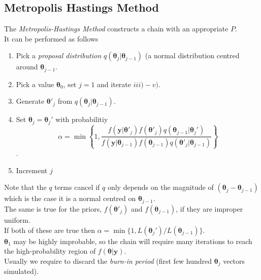 \documentclass[11pt,a4paper]{article}
\begin{document}
\subsection{Metropolis Hastings Method}

The \textit{Metropolis-Hastings Method} constructs a chain with an appropriate $P$.\\
It can be performed as follows
\begin{enumerate}
	\item Pick a \textit{proposal distribution} $q(\pmb\theta_j|\pmb\theta_{j-1})$ (\eg a normal distribution centred around $\pmb\theta_{j-1}$.
	\item Pick a value $\pmb\theta_0$, set $j=1$ and iterate $iii)-v)$.
	\item Generate $\pmb\theta'_j$ from $q(\pmb\theta_j|\pmb\theta_{j-1})$.
	\item Set $\pmb\theta_j=\pmb\theta_j'$ with probabilitiy
	$$\alpha=\min\left\{1,\dfrac{f(\textbf{y}|\pmb\theta'_j)f(\pmb\theta'_j)q(\pmb\theta_{j-1}|\pmb\theta_j')}{f(\textbf{y}|\pmb\theta_{j-1})f(\pmb\theta_{j-1})q(\pmb\theta'_j|\pmb\theta_{j-1})}\right\}$$.
	\item Increment $j$
\end{enumerate}

Note that the $q$ terms cancel if $q$ only depends on the magnitude of $(\pmb\theta_j-\pmb\theta_{j-1})$ which is the case it is a normal centred on $\pmb\theta_{j-1}$.\\
The same is true for the priors, $f(\pmb\theta'_j)$ and $f(\pmb\theta_{j-1})$, if they are improper uniform.\\
If both of these are true then $\alpha=\min\{1,L(\pmb\theta_j')/L(\pmb\theta_{j-1})\}$.\\

$\pmb\theta_1$ may be highly improbable, so the chain will require many iterations to reach the high-probability region of $f(\pmb\theta|\textbf{y})$.\\
Usually we require to discard the \textit{burn-in period} (\ie first few hundred $\pmb\theta_j$ vectors simulated).
\end{document}
